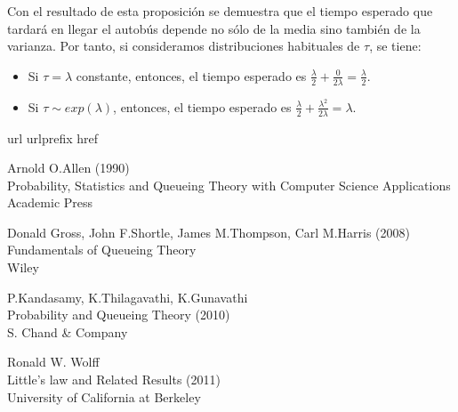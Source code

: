 \documentclass[a4paper,10pt]{scrartcl}
\theoremstyle{definition}
\theoremstyle{definition}
\numberwithin{equation}{section}
\begin{document}
	Con el resultado de esta proposición se demuestra que el tiempo esperado que tardará en llegar el autobús depende no sólo de la media sino también de la varianza. Por tanto, si consideramos distribuciones habituales de $\tau$, se tiene:
	\begin{itemize}
		\item Si $\tau=\lambda$ constante, entonces, el tiempo esperado es $\frac{\lambda}{2} + \frac{0}{2\lambda} = \frac{\lambda}{2}$.
		\item Si $\tau \sim exp(\lambda)$, entonces, el tiempo esperado es $\frac{\lambda}{2} + \frac{\lambda^2}{2\lambda} = \lambda$.
	\end{itemize}
	
	
	\newpage
	\begin{thebibliography}{10}
		\expandafter\ifx\csname url\endcsname\relax
		\def\url#1{\texttt{#1}}\fi
		\expandafter\ifx\csname urlprefix\endcsname\relax\def\urlprefix{URL }\fi
		\expandafter\ifx\csname href\endcsname\relax
		\def\href#1#2{#2} \def\path#1{#1}\fi
		
		Arnold O.Allen (1990)\\
		Probability, Statistics and Queueing Theory with Computer Science Applications\\
		Academic Press
		
		Donald Gross, John F.Shortle, James M.Thompson, Carl M.Harris (2008)\\
		Fundamentals of Queueing Theory\\
		Wiley
		
		P.Kandasamy, K.Thilagavathi, K.Gunavathi\\
		Probability and Queueing Theory (2010)\\
		S. Chand \& Company
		
		Ronald W. Wolff\\
		Little's law and Related Results (2011)\\
		University of California at Berkeley
	\end{thebibliography}
	
\end{document}
